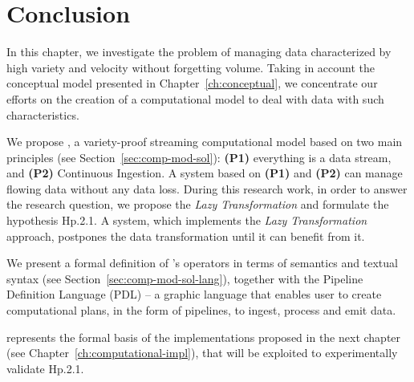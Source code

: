\section{Conclusion}
In this chapter, we investigate the problem of managing data characterized by high variety and velocity without forgetting volume.
Taking in account the conceptual model presented in Chapter~\ref{ch:conceptual}, we concentrate our efforts on the creation of a computational model to deal with data with such characteristics.

We propose \river{}, a variety-proof streaming computational model based on two main principles (see Section~\ref{sec:comp-mod-sol}): \textbf{(P1)} everything is a data stream, and \textbf{(P2)} Continuous Ingestion.
A system based on \textbf{(P1)} and \textbf{(P2)} can manage flowing data without any data loss.
During this research work, in order to answer the research question, we propose the \textit{Lazy Transformation} and formulate the hypothesis \textsf{Hp.2.1}.
A system, which implements the \textit{Lazy Transformation} approach, postpones the data transformation until it can benefit from it.

We present a formal definition of \river{}'s operators in terms of semantics and textual syntax (see Section~\ref{sec:comp-mod-sol-lang}), together with the Pipeline Definition Language (PDL) -- a graphic language that enables user to create computational plans, in the form of pipelines, to ingest, process and emit data.

\river{} represents the formal basis of the implementations proposed in the next chapter (see Chapter~\ref{ch:computational-impl}), that will be exploited to experimentally validate \textsf{Hp.2.1}.